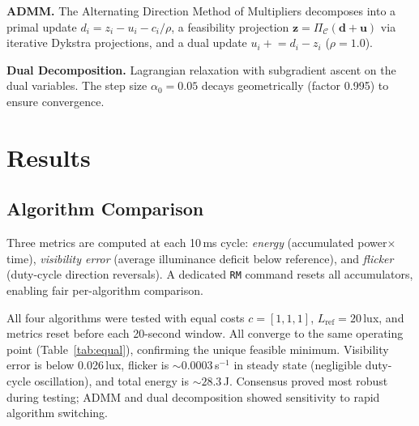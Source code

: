 \documentclass[10pt,twocolumn]{article}
\begin{document}
\textbf{ADMM.} The Alternating Direction Method of Multipliers decomposes into a primal update $d_i = z_i - u_i - c_i/\rho$, a feasibility projection $\mathbf{z} = \Pi_{\mathcal{C}}(\mathbf{d}+\mathbf{u})$ via iterative Dykstra projections, and a dual update $u_i \mathrel{+}= d_i - z_i$ ($\rho{=}1.0$).

\textbf{Dual Decomposition.} Lagrangian relaxation with subgradient ascent on the dual variables. The step size $\alpha_0{=}0.05$ decays geometrically (factor 0.995) to ensure convergence.

\section{Results}

\subsection{Algorithm Comparison}

Three metrics are computed at each 10\,ms cycle: \emph{energy} (accumulated power$\times$time), \emph{visibility error} (average illuminance deficit below reference), and \emph{flicker} (duty-cycle direction reversals). A dedicated \texttt{RM} command resets all accumulators, enabling fair per-algorithm comparison.

All four algorithms were tested with equal costs $c{=}[1,1,1]$, $L_{\text{ref}}{=}20$\,lux, and metrics reset before each 20-second window. All converge to the same operating point (Table~\ref{tab:equal}), confirming the unique feasible minimum. Visibility error is below 0.026\,lux, flicker is ${\sim}0.0003$\,s$^{-1}$ in steady state (negligible duty-cycle oscillation), and total energy is ${\sim}28.3$\,J. Consensus proved most robust during testing; ADMM and dual decomposition showed sensitivity to rapid algorithm switching.

\begin{table}[H]
\centering
\caption{Algorithm comparison, equal costs (20\,s window).}
\label{tab:equal}
\end{table}
\end{document}
